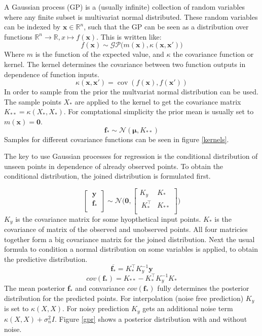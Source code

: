 \documentclass[english]{article}
\begin{document}
A Gaussian process (GP) is a (usually infinite) collection of random variables where any finite subset is multivariat normal distributed. These random variables can be indexed by $\mathbf{x} \in \mathbb{R}^n$, such that the GP can be seen as a distribution over functions $\mathbb{R}^n \rightarrow \mathbb{R}, x \mapsto f(\mathbf{x})$. This is written like:
$$f(\mathbf{x}) \sim \mathcal{GP}\big(m(\mathbf{x}), \kappa(\mathbf{x},\mathbf{x}')\big)$$
Where $m$ is the function of the expected value, and $\kappa$ the covariance function or kernel. The kernel determines the covariance between two function outputs in dependence of function inputs.
$$\kappa(\mathbf{x},\mathbf{x}') = \operatorname{cov}(f(\mathbf{x}),f(\mathbf{x}'))$$
In order to sample from the prior the multvariat normal distribution can be used. The sample points $X_*$ are applied to the kernel to get the covariance matrix $K_{**} = \kappa(X_*,X_*)$. For comptational simplicity the prior mean is usually set to $m(\mathbf{x}) = \mathbf{0}$.
$$\mathbf{f_*} \sim \mathcal{N}(\mathbf{\mathbf{\mu}}, K_{**})$$
Samples for different covariance functions can be seen in figure \ref{kernels}.

The key to use Gaussian processes for regression is the conditional distribution of unseen points in dependence of already observed points.
To obtain the conditional distribution, the joined distribution is formulated first.

$$
\begin{bmatrix}
\ \mathbf{y}\ \\
\ \mathbf{f_*} \\
\end{bmatrix}
\sim \mathcal{N} \Bigg(\mathbf{0},
\begin{bmatrix}
K_y & K_* \\
\ K^{\top}_{*} & K_{**}  \\
\end{bmatrix}
\Bigg)
$$
$K_y$ is the covariance matrix for some hyopthetical input points. $K_*$ is the covariance of matrix of the observed and unobserved points. All four matricies together form a big covariance matrix for the joined distribution. Next the usual formula to condition a normal distribution on some variables is applied, to obtain the predictive distribution.
$$\overline{\mathbf{f_*}} = K_*^\top K_y^{-1}\mathbf{y}$$
$$cov(\mathbf{f_*}) = K_{**} - K_*^\top K_y^{-1} K_*$$
The mean posterior $\overline{\mathbf{f_*}}$ and convariance $cov(\mathbf{f_*})$ fully determines the posterior distribution for the predicted points. For interpolation (noise free prediction) $K_y$ is set to  $\kappa(X,X)$. For noisy prediction $K_y$ gets an additional noise term $\kappa(X,X) + \sigma_n^2I$. Figure \ref{gpr} shows a posterior distribution with and without noise.
\end{document}
